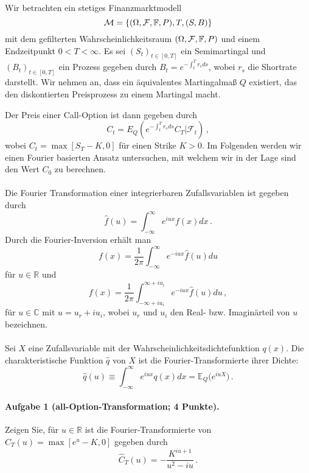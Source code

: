 \documentclass{article}
\begin{document}
Wir betrachten ein stetiges Finanzmarktmodell
\[
{\cal M}=\{(\Omega,{\cal F},\mathbb{F},P),T,(S,B)\}
\]
mit dem gefilterten Wahrscheinlichkeitsraum $(\Omega,{\cal F},\mathbb{F},P)$ und einem Endzeitpunkt $0<T<\infty$.
Es sei $(S_t)_{t\in[0,T]}$ ein Semimartingal und $(B_t)_{t\in[0,T]}$ ein Prozess gegeben durch $B_t=e^{-\int_t^T r_s ds}$, wobei $r_s$ die Shortrate darstellt.
Wir nehmen an, dass ein äquivalentes Martingalmaß $Q$ existiert, das den diskontierten Preisprozess zu einem Martingal macht.

Der Preis einer Call-Option  ist dann gegeben durch
\[
C_t=E_Q\left(e^{-\int_t^Tr_sds}C_T|\mathscr{F}_t\right)\,,
\]
wobei $C_t=\max[S_T-K,0]$ für einen Strike $K>0$.
Im Folgenden werden wir einen Fourier basierten Ansatz untersuchen, mit welchem wir in der Lage sind den Wert $C_0$ zu berechnen.
\paragraph{}
Die Fourier Transformation einer integrierbaren Zufallsvariablen ist gegeben durch
\begin{equation}
  \hat{f}(u)=\int_{-\infty}^\infty e^{iux}f(x)dx\,.\label{eq:fourier}
\end{equation}
Durch die Fourier-Inversion erhält man
\[
f(x)=\frac{1}{2\pi}\int_{-\infty}^\infty e^{-iux}\hat{f}(u)du
\]
für $u\in\mathbb{R}$ und
\[
  f(x)=\frac{1}{2\pi}\int_{-\infty+iu_i}^{\infty+iu_i}e^{-iux}\hat{f}(u)du\,,
\]
für $u\in\mathbb{C}$ mit $u=u_r+iu_i$, wobei $u_r$ und $u_i$ den Real- bzw. Imaginärteil von $u$ bezeichnen.
\paragraph{}
Sei $X$ eine Zufallsvariable mit der Wahrscheinlichkeitsdichtefunktion $q(x)$.
Die charakteristische Funktion $\hat{q}$ von $X$ ist die Fourier-Transformierte ihrer Dichte:
\[
\hat{q}(u)\equiv\int_{-\infty}^\infty e^{iux}q(x)dx=\mathbb{E}_Q\bigl(e^{iuX}\bigr)\,.
\]
\paragraph{Aufgabe 1 \textnormal{(all-Option-Transformation; 4 Punkte)}.}
Zeigen Sie, für $u\in\mathbb{R}$ ist die Fourier-Transformierte von $C_T(u)=\max[e^u-K,0]$ gegeben durch
\begin{equation}
  \label{eq:chat}
  \hat{C}_T(u)=-\frac{K^{iu+1}}{u^2-iu}\,.
\end{equation}
\end{document}
